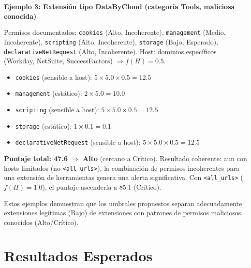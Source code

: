 \documentclass[12pt,oneside]{report}
\begin{document}
\textbf{Ejemplo 3: Extensión tipo DataByCloud (categoría Tools, maliciosa conocida)}

Permisos documentados: \texttt{cookies} (Alto, Incoherente), \texttt{management} (Medio, Incoherente), \texttt{scripting} (Alto, Incoherente), \texttt{storage} (Bajo, Esperado), \texttt{declarativeNetRequest} (Alto, Incoherente). Host: dominios específicos (Workday, NetSuite, SuccessFactors) $\Rightarrow f(H)=0.5$.

\begin{itemize}
    \item \texttt{cookies} (sensible a host): $5 \times 5.0 \times 0.5 = 12.5$
    \item \texttt{management} (estático): $2 \times 5.0 = 10.0$
    \item \texttt{scripting} (sensible a host): $5 \times 5.0 \times 0.5 = 12.5$
    \item \texttt{storage} (estático): $1 \times 0.1 = 0.1$
    \item \texttt{declarativeNetRequest} (sensible a host): $5 \times 5.0 \times 0.5 = 12.5$
\end{itemize}
\textbf{Puntaje total: 47.6} $\Rightarrow$ \textbf{Alto} (cercano a Crítico). Resultado coherente: aun con hosts limitados (no \texttt{<all\_urls>}), la combinación de permisos incoherentes para una extensión de herramientas genera una alerta significativa. Con \texttt{<all\_urls>} ($f(H)=1.0$), el puntaje ascendería a 85.1 (Crítico).

Estos ejemplos demuestran que los umbrales propuestos separan adecuadamente extensiones legítimas (Bajo) de extensiones con patrones de permisos maliciosos conocidos (Alto/Crítico).

\endgroup



\chapter{Resultados Esperados}
\label{chap:resultados}

\begingroup
\setlength{\parindent}{0pt}
\setlength{\parskip}{0.6em}
\end{document}
